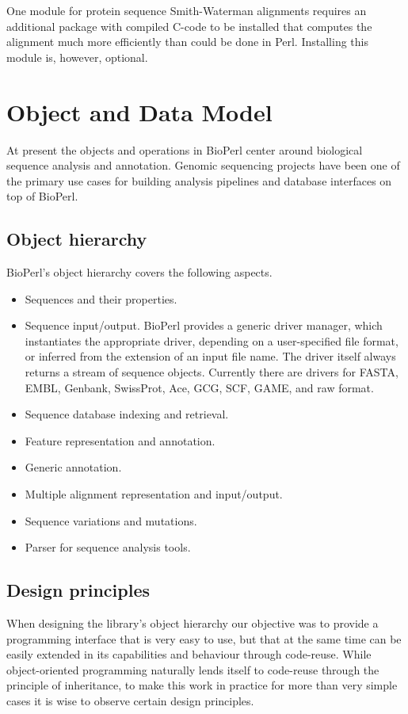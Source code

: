 \documentclass{article}
\begin{document}
\begin{twocolumn}
One module for protein sequence Smith-Waterman alignments requires an
additional package with compiled C-code to be installed that computes
the alignment much more efficiently than could be done in
Perl. Installing this module is, however, optional.

\section{Object and Data Model}

At present the objects and operations in BioPerl center around
biological sequence analysis and annotation. Genomic sequencing
projects have been one of the primary use cases for building analysis
pipelines and database interfaces on top of BioPerl. 

\subsection{Object hierarchy}

BioPerl's object hierarchy covers the following aspects.
\begin{itemize}
\item Sequences and their properties.
\item Sequence input/output. BioPerl provides a generic driver
manager, which instantiates the appropriate driver, depending on a
user-specified file format, or inferred from the extension of an input
file name. The driver itself always returns a stream of sequence
objects. Currently there are drivers for FASTA, EMBL, Genbank, SwissProt,
Ace, GCG, SCF, GAME, and raw format.
\item Sequence database indexing and retrieval. 
\item Feature representation and annotation.
\item Generic annotation.
\item Multiple alignment representation and input/output.
\item Sequence variations and mutations.
\item Parser for sequence analysis tools.
\end{itemize}

\subsection{Design principles}

When designing the library's object hierarchy our objective was to
provide a programming interface that is very easy to use, but that at
the same time can be easily extended in its capabilities and behaviour
through code-reuse. While object-oriented programming naturally lends
itself to code-reuse through the principle of inheritance, to make
this work in practice for more than very simple cases it is wise to
observe certain design principles. 


\end{twocolumn}
\end{document}
